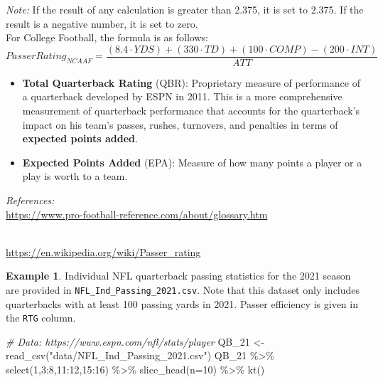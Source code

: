 \documentclass[
  11pt,
]{book}
\newenvironment{Shaded}{\begin{snugshade}}{\end{snugshade}}
\newcommand{\AttributeTok}[1]{\textcolor[rgb]{0.77,0.63,0.00}{#1}}
\newcommand{\CommentTok}[1]{\textcolor[rgb]{0.56,0.35,0.01}{\textit{#1}}}
\newcommand{\DecValTok}[1]{\textcolor[rgb]{0.00,0.00,0.81}{#1}}
\newcommand{\FunctionTok}[1]{\textcolor[rgb]{0.00,0.00,0.00}{#1}}
\newcommand{\NormalTok}[1]{#1}
\newcommand{\OtherTok}[1]{\textcolor[rgb]{0.56,0.35,0.01}{#1}}
\newcommand{\SpecialCharTok}[1]{\textcolor[rgb]{0.00,0.00,0.00}{#1}}
\newcommand{\StringTok}[1]{\textcolor[rgb]{0.31,0.60,0.02}{#1}}
\theoremstyle{definition}
\theoremstyle{definition}
\newtheorem{example}{Example}[chapter]
\theoremstyle{definition}
\theoremstyle{definition}
\theoremstyle{remark}
\begin{document}
\emph{Note:} If the result of any calculation is greater than 2.375, it is set to 2.375. If the result is a negative number, it is set to zero.\\

For College Football, the formula is as follows:\\

\[Passer Rating_{NCAAF} = \frac{(8.4 \cdot YDS) + (330 \cdot TD) + (100 \cdot COMP) - (200 \cdot INT)}{ATT}\]

\begin{itemize}
\item
  \textbf{Total Quarterback Rating} (QBR): Proprietary measure of performance of a quarterback developed by ESPN in 2011. This is a more comprehensive measurement of quarterback performance that accounts for the quarterback's impact on his team's passes, rushes, turnovers, and penalties in terms of \textbf{expected points added}.
\item
  \textbf{Expected Points Added} (EPA): Measure of how many points a player or a play is worth to a team.
\end{itemize}

\emph{References:}\\
\url{https://www.pro-football-reference.com/about/glossary.htm}\strut \\
\url{https://en.wikipedia.org/wiki/Passer_rating}

\newpage

\begin{example}
Individual NFL quarterback passing statistics for the 2021 season are provided in \texttt{NFL\_Ind\_Passing\_2021.csv}. Note that this dataset only includes quarterbacks with at least 100 passing yards in 2021. Passer efficiency is given in the \texttt{RTG} column.
\end{example}

\begin{Shaded}
\begin{Highlighting}[]
\CommentTok{\# Data: https://www.espn.com/nfl/stats/player}
\NormalTok{QB\_21 }\OtherTok{\textless{}{-}} \FunctionTok{read\_csv}\NormalTok{(}\StringTok{"data/NFL\_Ind\_Passing\_2021.csv"}\NormalTok{)}
\NormalTok{QB\_21 }\SpecialCharTok{\%\textgreater{}\%} \FunctionTok{select}\NormalTok{(}\DecValTok{1}\NormalTok{,}\DecValTok{3}\SpecialCharTok{:}\DecValTok{8}\NormalTok{,}\DecValTok{11}\SpecialCharTok{:}\DecValTok{12}\NormalTok{,}\DecValTok{15}\SpecialCharTok{:}\DecValTok{16}\NormalTok{) }\SpecialCharTok{\%\textgreater{}\%} \FunctionTok{slice\_head}\NormalTok{(}\AttributeTok{n=}\DecValTok{10}\NormalTok{) }\SpecialCharTok{\%\textgreater{}\%} \FunctionTok{kt}\NormalTok{()}
\end{Highlighting}
\end{Shaded}
\end{document}

